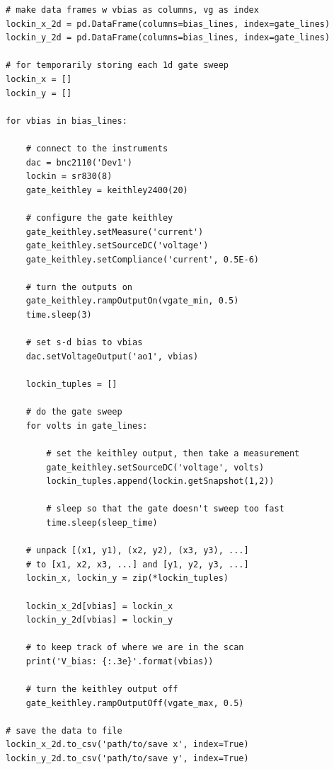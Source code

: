 \documentclass[edeposit,fullpage,draftthesis]{uiucthesis2009}
\begin{document}
\begin{appendices}
\begin{verbatim}
# make data frames w vbias as columns, vg as index
lockin_x_2d = pd.DataFrame(columns=bias_lines, index=gate_lines)
lockin_y_2d = pd.DataFrame(columns=bias_lines, index=gate_lines)

# for temporarily storing each 1d gate sweep
lockin_x = []
lockin_y = []

for vbias in bias_lines:
    
    # connect to the instruments
    dac = bnc2110('Dev1')
    lockin = sr830(8)
    gate_keithley = keithley2400(20)

    # configure the gate keithley
    gate_keithley.setMeasure('current')
    gate_keithley.setSourceDC('voltage')
    gate_keithley.setCompliance('current', 0.5E-6)

    # turn the outputs on
    gate_keithley.rampOutputOn(vgate_min, 0.5)
    time.sleep(3)

    # set s-d bias to vbias
    dac.setVoltageOutput('ao1', vbias)
    
    lockin_tuples = []

    # do the gate sweep
    for volts in gate_lines:

        # set the keithley output, then take a measurement
        gate_keithley.setSourceDC('voltage', volts)
        lockin_tuples.append(lockin.getSnapshot(1,2))
        
        # sleep so that the gate doesn't sweep too fast
        time.sleep(sleep_time)

    # unpack [(x1, y1), (x2, y2), (x3, y3), ...] 
    # to [x1, x2, x3, ...] and [y1, y2, y3, ...]
    lockin_x, lockin_y = zip(*lockin_tuples)
        
    lockin_x_2d[vbias] = lockin_x
    lockin_y_2d[vbias] = lockin_y

    # to keep track of where we are in the scan
    print('V_bias: {:.3e}'.format(vbias))
    
    # turn the keithley output off
    gate_keithley.rampOutputOff(vgate_max, 0.5)

# save the data to file
lockin_x_2d.to_csv('path/to/save x', index=True)
lockin_y_2d.to_csv('path/to/save y', index=True)
\end{verbatim}


\end{appendices}

\backmatter


%
%
%
%
%

\end{document}
